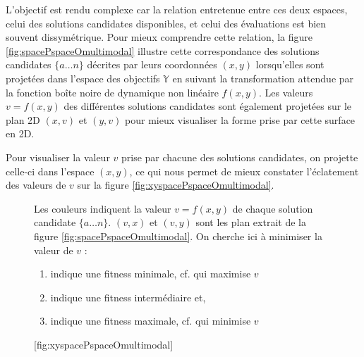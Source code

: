 L'objectif est rendu complexe car la relation entretenue entre ces deux espaces, celui des solutions candidates disponibles, et celui des évaluations est bien souvent dissymétrique. Pour mieux comprendre cette relation, la figure \ref{fig:spacePspaceOmultimodal} illustre cette correspondance des solutions candidates $\{a \dotsc n\}$ décrites par leurs coordonnées $(x,y)$ lorsqu'elles sont projetées dans l'espace des objectifs $\mathbb{Y}$ en suivant la transformation attendue par la fonction boîte noire de dynamique non linéaire $f(x,y)$. Les valeurs $v = f(x,y)$ des différentes solutions candidates sont également projetées sur le plan 2D $(x,v)$ et $(y,v)$ pour mieux visualiser la forme prise par cette surface en 2D.

Pour visualiser la valeur $v$ prise par chacune des solutions candidates, on projette celle-ci dans l'espace $(x,y)$, ce qui nous permet de mieux constater l'éclatement des valeurs de $v$ sur la figure \ref{fig:xyspacePspaceOmultimodal}.

\begin{figure}[htbp]
	\begin{sidecaption}[fortoc]{Les couleurs indiquent la valeur $v = f(x,y)$ de chaque solution candidate $\{a \dotsc n\}$. $(v,x)$ et $(v,y)$ sont les plan extrait de la figure \ref{fig:spacePspaceOmultimodal}. On cherche ici à minimiser la valeur de $v$ :
\parbox{\marginparwidth}{
\begin{enumerate}[label={},labelindent=0pt,leftmargin=*]
        \item {} indique une fitness minimale, cf. qui maximise $v$
        \item {} indique une fitness intermédiaire et,
        \item {} indique une fitness maximale, cf. qui minimise $v$
\end{enumerate}}}[fig:xyspacePspaceOmultimodal]
	 \centering
	\end{sidecaption}
\end{figure}


